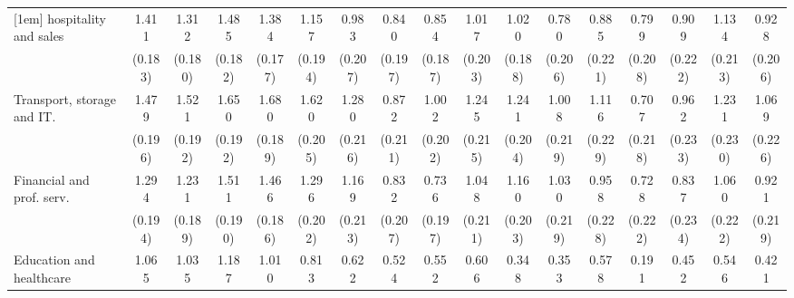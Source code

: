 {\begin{tabular}{l*{16}{c}}
[1em]
hospitality and sales&       1.411\sym{***}&       1.312\sym{***}&       1.485\sym{***}&       1.384\sym{***}&       1.157\sym{***}&       0.983\sym{***}&       0.840\sym{***}&       0.854\sym{***}&       1.017\sym{***}&       1.020\sym{***}&       0.780\sym{***}&       0.885\sym{***}&       0.799\sym{***}&       0.909\sym{***}&       1.134\sym{***}&       0.928\sym{***}\\
                    &     (0.183)         &     (0.180)         &     (0.182)         &     (0.177)         &     (0.194)         &     (0.207)         &     (0.197)         &     (0.187)         &     (0.203)         &     (0.188)         &     (0.206)         &     (0.221)         &     (0.208)         &     (0.222)         &     (0.213)         &     (0.206)         \\
[1em]
Transport, storage and IT.&       1.479\sym{***}&       1.521\sym{***}&       1.650\sym{***}&       1.680\sym{***}&       1.620\sym{***}&       1.280\sym{***}&       0.872\sym{***}&       1.002\sym{***}&       1.245\sym{***}&       1.241\sym{***}&       1.008\sym{***}&       1.116\sym{***}&       0.707\sym{**} &       0.962\sym{***}&       1.231\sym{***}&       1.069\sym{***}\\
                    &     (0.196)         &     (0.192)         &     (0.192)         &     (0.189)         &     (0.205)         &     (0.216)         &     (0.211)         &     (0.202)         &     (0.215)         &     (0.204)         &     (0.219)         &     (0.229)         &     (0.218)         &     (0.233)         &     (0.230)         &     (0.226)         \\
[1em]
Financial and prof. serv.&       1.294\sym{***}&       1.231\sym{***}&       1.511\sym{***}&       1.466\sym{***}&       1.296\sym{***}&       1.169\sym{***}&       0.832\sym{***}&       0.736\sym{***}&       1.048\sym{***}&       1.160\sym{***}&       1.030\sym{***}&       0.958\sym{***}&       0.728\sym{**} &       0.837\sym{***}&       1.060\sym{***}&       0.921\sym{***}\\
                    &     (0.194)         &     (0.189)         &     (0.190)         &     (0.186)         &     (0.202)         &     (0.213)         &     (0.207)         &     (0.197)         &     (0.211)         &     (0.203)         &     (0.219)         &     (0.228)         &     (0.222)         &     (0.234)         &     (0.222)         &     (0.219)         \\
[1em]
Education and healthcare&       1.065\sym{***}&       1.035\sym{***}&       1.187\sym{***}&       1.010\sym{***}&       0.813\sym{***}&       0.622\sym{**} &       0.524\sym{*}  &       0.552\sym{*}  &       0.606\sym{**} &       0.348         &       0.353         &       0.578\sym{*}  &       0.191         &       0.452         &       0.546\sym{*}  &       0.421         \\

\end{tabular}}
